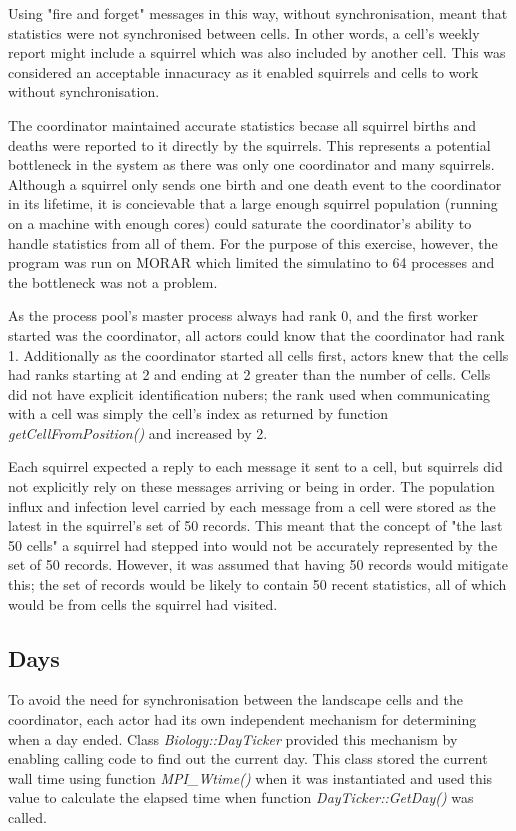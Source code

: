 \documentclass[11pt, oneside]{article}   %
\begin{document}
Using "fire and forget" messages in this way, without synchronisation, meant that statistics were not synchronised between cells.
In other words, a cell's weekly report might include a squirrel which was also included by another cell.
This was considered an acceptable innacuracy as it enabled squirrels and cells to work without synchronisation.

The coordinator maintained accurate statistics becase all squirrel births and deaths were reported to it directly by the squirrels.
This represents a potential bottleneck in the system as there was only one coordinator and many squirrels. 
Although a squirrel only sends one birth and one death event to the coordinator in its lifetime, it is concievable that a large enough squirrel population (running on a machine with enough cores) could saturate the coordinator's ability to handle statistics from all of them.
For the purpose of this exercise, however, the program was run on MORAR which limited the simulatino to 64 processes and the bottleneck was not a problem.

As the process pool's master process always had rank 0, and the first worker started was the coordinator, all actors could know that the coordinator had rank 1.
Additionally as the coordinator started all cells first, actors knew that the cells had ranks starting at 2 and ending at 2 greater than the number of cells.
Cells did not have explicit identification nubers; the rank used when communicating with a cell was simply the cell's index as returned by function {\em getCellFromPosition()} and increased by 2.

Each squirrel expected a reply to each message it sent to a cell, but squirrels did not explicitly rely on these messages arriving or being in order.
The population influx and infection level carried by each message from a cell were stored as the latest in the squirrel's set of 50 records.
This meant that the concept of "the last 50 cells" a squirrel had stepped into would not be accurately represented by the set of 50 records.
However, it was assumed that having 50 records would mitigate this; the set of records would be likely to contain 50 recent statistics, all of which would be from cells the squirrel had visited.

\subsection{Days}

To avoid the need for synchronisation between the landscape cells and the coordinator, each actor had its own independent mechanism for determining when a day ended.
Class {\em Biology::DayTicker} provided this mechanism by enabling calling code to find out the current day.
This class stored the current wall time using function {\em MPI\_Wtime()} when it was instantiated and used this value to calculate the elapsed time when function {\em DayTicker::GetDay()} was called.
\end{document}
